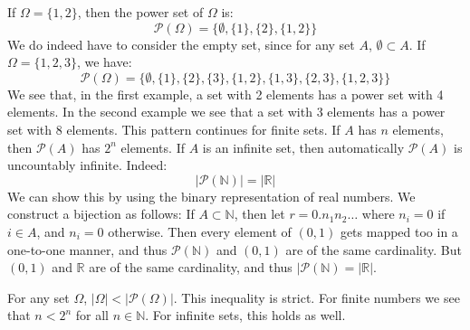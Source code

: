 \documentclass[crop=false,class=book,oneside]{standalone}
\begin{document}
        \begin{example}
            If $\Omega=\{1,2\}$, then the power set of $\Omega$
            is:
            \begin{equation}
                \mathcal{P}(\Omega)=
                \{\emptyset,\{1\},\{2\},\{1,2\}\}
            \end{equation}
            We do indeed have to consider the empty set, since
            for any set $A$, $\emptyset\subset{A}$. If
            $\Omega=\{1,2,3\}$, we have:
            \begin{equation}
                \mathcal{P}(\Omega)=
                \{\emptyset,\{1\},\{2\},\{3\},\{1,2\},
                  \{1,3\},\{2,3\},\{1,2,3\}\}
            \end{equation}
            We see that, in the first example, a set with
            2 elements has a power set with 4 elements. In the
            second example we see that a set with 3 elements has
            a power set with 8 elements. This pattern continues
            for finite sets. If $A$ has $n$ elements, then
            $\mathcal{P}(A)$ has $2^{n}$ elements. If
            $A$ is an infinite set, then automatically
            $\mathcal{P}(A)$ is uncountably infinite. Indeed:
            \begin{equation}
                |\mathcal{P}(\mathbb{N})|=|\mathbb{R}|
            \end{equation}
            We can show this by using the binary representation
            of real numbers. We construct a bijection as
            follows: If $A\subset\mathbb{N}$, then
            let $r=0.n_{1}n_{2}\hdots$ where
            $n_{i}=0$ if $i\in{A}$, and $n_{i}=0$ otherwise.
            Then every element of $(0,1)$ gets mapped too in
            a one-to-one manner, and thus
            $\mathcal{P}(\mathbb{N})$ and $(0,1)$ are of the
            same cardinality. But $(0,1)$ and $\mathbb{R}$
            are of the same cardinality, and thus
            $|\mathcal{P}(\mathbb{N})=|\mathbb{R}|$.
        \end{example}
        For any set $\Omega$, $|\Omega|<|\mathcal{P}(\Omega)|$.
        This inequality is strict. For finite numbers we see
        that $n<2^{n}$ for all $n\in\mathbb{N}$. For infinite
        sets, this holds as well.
\end{document}
